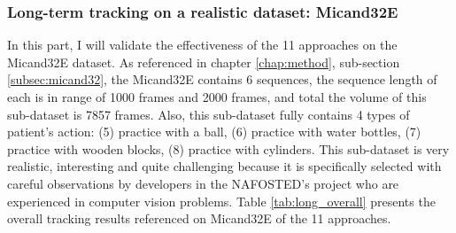 \subsubsection{Long-term tracking on a realistic dataset: Micand32E}
In this part, I will validate the effectiveness of the 11 approaches on the Micand32E dataset. As referenced in chapter \ref{chap:method}, sub-section \ref{subsec:micand32}, the Micand32E contains 6 sequences, the sequence length of each is in range of 1000 frames and 2000 frames, and total the volume of this sub-dataset is 7857 frames. Also, this sub-dataset fully contains 4 types of patient’s action: (5) practice with a ball, (6) practice with water bottles, (7) practice with wooden blocks, (8) practice with cylinders. This sub-dataset is very realistic, interesting and quite challenging because it is specifically selected with careful observations  by developers in the NAFOSTED’s project who are experienced in computer vision problems.
Table \ref{tab:long_overall} presents the overall tracking results referenced on Micand32E of the 11 approaches.
